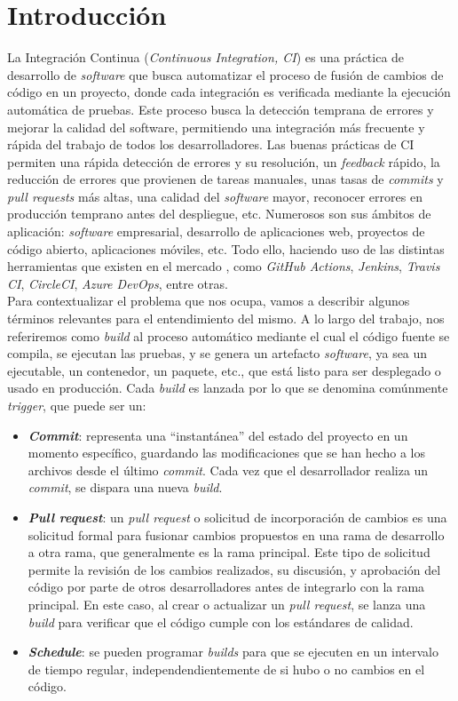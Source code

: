 \section{Introducción}
La Integración Continua (\textit{Continuous Integration, CI}) es una práctica de desarrollo de
\textit{software} que busca automatizar el proceso de fusión de cambios de código en un proyecto,
donde cada integración es verificada mediante la ejecución automática de pruebas. Este proceso
busca la detección temprana de errores y mejorar la calidad del software, permitiendo una
integración más frecuente y rápida del trabajo de todos los desarrolladores. Las buenas prácticas
de CI \cite{8} permiten una rápida detección de errores y su resolución, un
\textit{feedback} rápido, la reducción de errores que provienen de tareas manuales, unas tasas de
\textit{commits} y \textit{pull requests} más altas, una calidad del \textit{software} mayor,
reconocer errores en producción temprano antes del despliegue, etc. Numerosos son sus ámbitos
de aplicación: \textit{software} empresarial, desarrollo de aplicaciones web, proyectos de código
abierto, aplicaciones móviles, etc. Todo ello, haciendo uso de las distintas herramientas que
existen en el mercado \cite{9}, como \textit{GitHub Actions}, \textit{Jenkins},
\textit{Travis CI}, \textit{CircleCI}, \textit{Azure DevOps}, entre otras.\\

Para contextualizar el problema que nos ocupa, vamos a describir algunos términos relevantes para
el entendimiento del mismo. A lo largo del trabajo, nos referiremos como \textit{build} al 
proceso automático mediante el cual el código fuente se compila, se ejecutan las pruebas, y se
genera un artefacto \textit{software}, ya sea un ejecutable, un contenedor, un paquete, etc., que
está listo para ser desplegado o usado en producción. Cada \textit{build} es lanzada por lo
que se denomina comúnmente \textit{trigger}, que puede ser un:
\begin{itemize}
    \item \textbf{\textit{Commit}}: representa una ``instantánea'' del estado del proyecto en 
    un momento específico, guardando las modificaciones que se han hecho a los archivos desde el
    último \textit{commit}. Cada vez que el desarrollador realiza un \textit{commit}, se dispara
    una nueva \textit{build}.
    \item \textbf{\textit{Pull request}}: un \textit{pull request} o solicitud de incorporación
    de cambios es una solicitud formal para fusionar cambios propuestos en una rama de desarrollo
    a otra rama, que generalmente es la rama principal. Este tipo de solicitud permite la
    revisión de los cambios realizados, su discusión, y aprobación del código por parte de
    otros desarrolladores antes de integrarlo con la rama principal. En este caso, al crear o
    actualizar un \textit{pull request}, se lanza una \textit{build} para verificar que el código
    cumple con los estándares de calidad.
    \item \textbf{\textit{Schedule}}: se pueden programar \textit{builds} para que se ejecuten
    en un intervalo de tiempo regular, independendientemente de si hubo o no cambios en el código.
\end{itemize}

